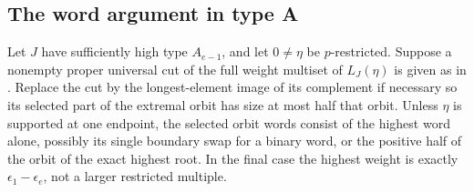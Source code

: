 \subsection{The word argument in type A}

\begin{lemma}\label{w:a-word-cuts}
Let $J$ have sufficiently high type $A_{e-1}$, and let $0\ne\eta$ be $p$-restricted. Suppose a nonempty proper universal cut of the full weight multiset of $L_J(\eta)$ is given as in . Replace the cut by the longest-element image of its complement if necessary so its selected part of the extremal orbit has size at most half that orbit. Unless $\eta$ is supported at one endpoint, the selected orbit words consist of the highest word alone, possibly its single boundary swap for a binary word, or the positive half of the orbit of the exact highest root. In the final case the highest weight is exactly $\epsilon_1-\epsilon_e$, not a larger restricted multiple.
\end{lemma}
